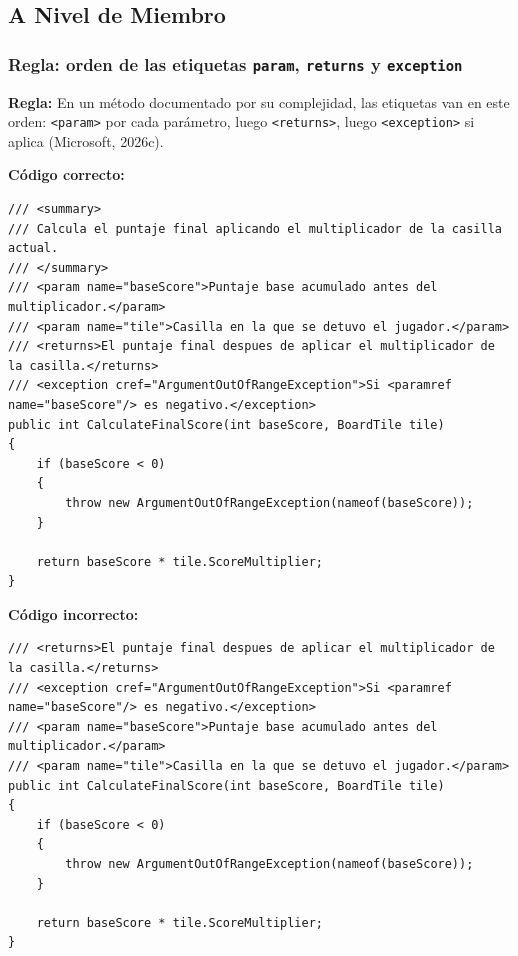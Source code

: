 \subsection{A Nivel de Miembro}

\subsubsection{Regla: orden de las etiquetas \texttt{param}, \texttt{returns} y \texttt{exception}}

\textbf{Regla:} En un método documentado por su complejidad, las etiquetas van en este orden: \texttt{<param>} por cada parámetro, luego \texttt{<returns>}, luego \texttt{<exception>} si aplica (Microsoft, 2026c).

\textbf{Código correcto:}
\begin{lstlisting}[style=csharpstyle]
/// <summary>
/// Calcula el puntaje final aplicando el multiplicador de la casilla actual.
/// </summary>
/// <param name="baseScore">Puntaje base acumulado antes del multiplicador.</param>
/// <param name="tile">Casilla en la que se detuvo el jugador.</param>
/// <returns>El puntaje final despues de aplicar el multiplicador de la casilla.</returns>
/// <exception cref="ArgumentOutOfRangeException">Si <paramref name="baseScore"/> es negativo.</exception>
public int CalculateFinalScore(int baseScore, BoardTile tile)
{
    if (baseScore < 0)
    {
        throw new ArgumentOutOfRangeException(nameof(baseScore));
    }

    return baseScore * tile.ScoreMultiplier;
}
\end{lstlisting}

\textbf{Código incorrecto:}
\begin{lstlisting}[style=csharpstyle]
/// <returns>El puntaje final despues de aplicar el multiplicador de la casilla.</returns>
/// <exception cref="ArgumentOutOfRangeException">Si <paramref name="baseScore"/> es negativo.</exception>
/// <param name="baseScore">Puntaje base acumulado antes del multiplicador.</param>
/// <param name="tile">Casilla en la que se detuvo el jugador.</param>
public int CalculateFinalScore(int baseScore, BoardTile tile)
{
    if (baseScore < 0)
    {
        throw new ArgumentOutOfRangeException(nameof(baseScore));
    }

    return baseScore * tile.ScoreMultiplier;
}
\end{lstlisting}
